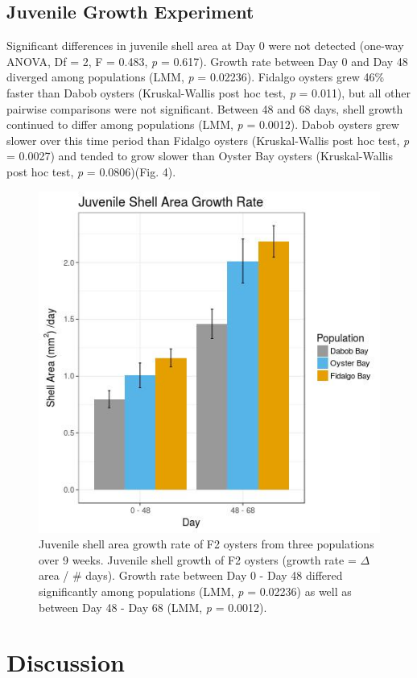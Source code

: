 \documentclass[fleqn,10pt]{wlscirep}
\begin{document}
\subsection*{Juvenile Growth Experiment}
Significant differences in juvenile shell area at Day 0 were not detected (one-way ANOVA, Df = 2, F = 0.483, \textit{p} = 0.617). Growth rate between Day 0 and Day 48 diverged among populations (LMM, \textit{p} = 0.02236). Fidalgo oysters grew 46\% faster than Dabob oysters (Kruskal-Wallis post hoc test, \textit{p} = 0.011), but all other pairwise comparisons were not significant. Between 48 and 68 days, shell growth continued to differ among populations (LMM, \textit{p} = 0.0012). Dabob oysters grew slower over this time period than Fidalgo oysters (Kruskal-Wallis post hoc test, \textit{p} = 0.0027) and tended to grow slower than Oyster Bay oysters (Kruskal-Wallis post hoc test, \textit{p} = 0.0806)(Fig. 4).
 
\begin{figure}[H]
\centering
\includegraphics[width=0.6\linewidth]{Juvenile_Growth_Bar_PS215_color}
\caption{Juvenile shell area growth rate of F2 oysters from three populations over 9 weeks. Juvenile shell growth of F2 oysters (growth rate = $\Delta$area / \# days). Growth rate between Day 0 - Day 48 differed significantly among populations (LMM, \textit{p} = 0.02236) as well as between Day 48 - Day 68 (LMM, \textit{p} = 0.0012).}
\label{fig:Figure 4}
\end{figure}

\section*{Discussion}
\end{document}

